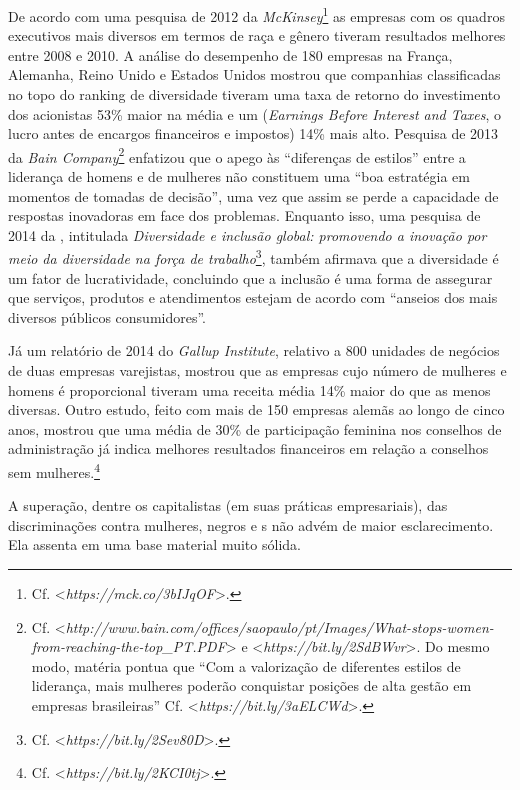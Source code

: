 De acordo com uma pesquisa de 2012 da \emph{McKinsey}\footnote{Cf.
  \textless{}\emph{https://mck.co/3bIJqOF}\textgreater{}.} as
empresas com os quadros executivos mais diversos em termos de raça e
gênero tiveram resultados melhores entre 2008 e 2010. A análise do
desempenho de 180 empresas na França, Alemanha, Reino Unido e Estados
Unidos mostrou que companhias classificadas no topo do ranking de
diversidade tiveram uma taxa de retorno do investimento dos acionistas
53\% maior na média e um  (\emph{Earnings Before Interest and
Taxes}, o lucro antes de encargos financeiros e impostos) 14\% mais
alto. Pesquisa de 2013 da \emph{Bain Company}\footnote{Cf.
  \textless{}\emph{http://www.bain.com/offices/saopaulo/pt/Images/What-stops-women-from-reaching-the-top\_PT.PDF}\textgreater{} %
  e
  \textless{}\emph{https://bit.ly/2SdBWvr}\textgreater{}.
  Do mesmo modo, matéria pontua que ``Com a valorização de diferentes
  estilos de liderança, mais mulheres poderão conquistar posições de
  alta gestão em empresas brasileiras'' Cf.
  \textless{}\emph{https://bit.ly/3aELCWd}\textgreater{}.}
enfatizou que o apego às ``diferenças de estilos'' entre a liderança de
homens e de mulheres não constituem uma ``boa estratégia em momentos de
tomadas de decisão'', uma vez que assim se perde a capacidade de
respostas inovadoras em face dos problemas. Enquanto isso, uma pesquisa
de 2014 da , intitulada \emph{Diversidade e inclusão global:
promovendo a inovação por meio da diversidade na força de
trabalho}\footnote{Cf.
  \textless{}\emph{https://bit.ly/2Sev80D}\textgreater{}.},
também afirmava que a diversidade é um fator de lucratividade,
concluindo que a inclusão é uma forma de assegurar que serviços,
produtos e atendimentos estejam de acordo com ``anseios dos mais
diversos públicos consumidores''.

Já um relatório de 2014 do \emph{Gallup Institute}, relativo a 800
unidades de negócios de duas empresas varejistas, mostrou que as
empresas cujo número de mulheres e homens é proporcional tiveram uma
receita média 14\% maior do que as menos diversas. Outro estudo, feito
com mais de 150 empresas alemãs ao longo de cinco anos, mostrou que uma
média de 30\% de participação feminina nos conselhos de administração já
indica melhores resultados financeiros em relação a conselhos sem
mulheres.\footnote{Cf.
  \textless{}\emph{https://bit.ly/2KCI0tj}\textgreater{}.}

A superação, dentre os capitalistas (em suas práticas empresariais), das
discriminações contra mulheres, negros e s não advém de maior
esclarecimento. Ela assenta em uma base material muito sólida.

